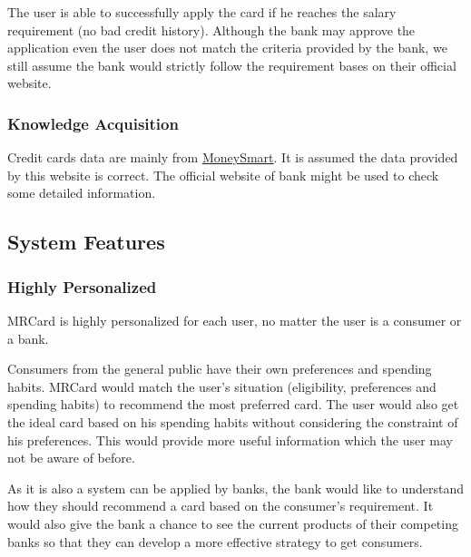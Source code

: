 	The user is able to successfully apply the card if he reaches the salary requirement (no bad credit history). Although the bank may approve the application even the user does not match the criteria provided by the bank, we still assume the bank would strictly follow the requirement bases on their official website.


	\subsubsection{Knowledge Acquisition} %
	\label{ssub:knowledge_acquisition}
	Credit cards data are mainly from \href{https://www.moneysmart.sg/credit-cards}{MoneySmart}. It is assumed the data provided by this website is correct. The official website of bank might be used to check some detailed information.




\subsection{System Features} %
\label{sub:system_features}

	\subsubsection{Highly Personalized} %
	\label{ssub:highly_personalized}
	MRCard is highly personalized for each user, no matter the user is a consumer or a bank.

	Consumers from the general public have their own preferences and spending habits. MRCard would match the user's situation (eligibility, preferences and spending habits) to recommend the most preferred card. The user would also get the ideal card based on his spending habits without considering the constraint of his preferences. This would provide more useful information which the user may not be aware of before.

	As it is also a system can be applied by banks, the bank would like to understand how they should recommend a card based on the consumer's requirement. It would also give the bank a chance to see the current products of their competing banks so that they can develop a more effective strategy to get consumers.


